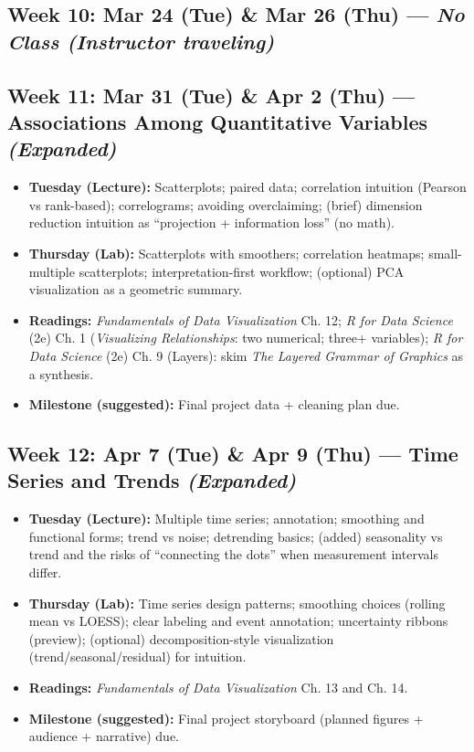 \documentclass[letterpaper,11pt]{article}
\newcommand{\FDV}{\emph{Fundamentals of Data Visualization}}
\newcommand{\RDS}{\emph{R for Data Science} (2e)}
\newcommand{\compresslist}{
\setlength{\itemsep}{1pt}
\setlength{\parskip}{0pt}
\setlength{\parsep}{0pt}
}
\begin{document}
\subsection*{Week 10: Mar 24 (Tue) \& Mar 26 (Thu) --- \textit{No Class (Instructor traveling)}}



\subsection*{Week 11: Mar 31 (Tue) \& Apr 2 (Thu) --- Associations Among Quantitative Variables \textit{(Expanded)}} 
\begin{itemize}\compresslist
\item \textbf{Tuesday (Lecture):} Scatterplots; paired data; correlation intuition (Pearson vs rank-based); correlograms; avoiding overclaiming; (brief) dimension reduction intuition as ``projection + information loss'' (no math).
\item \textbf{Thursday (Lab):} Scatterplots with smoothers; correlation heatmaps; small-multiple scatterplots; interpretation-first workflow; (optional) PCA visualization as a geometric summary.
\item \textbf{Readings:} \FDV{} Ch. 12; \RDS{} Ch. 1 (\emph{Visualizing Relationships}: two numerical; three+ variables); \RDS{} Ch. 9 (Layers): skim \emph{The Layered Grammar of Graphics} as a synthesis.
\item \textbf{Milestone (suggested):} Final project data + cleaning plan due.
\end{itemize}

\subsection*{Week 12: Apr 7 (Tue) \& Apr 9 (Thu) --- Time Series and Trends \textit{(Expanded)}} 
\begin{itemize}\compresslist
\item \textbf{Tuesday (Lecture):} Multiple time series; annotation; smoothing and functional forms; trend vs noise; detrending basics; (added) seasonality vs trend and the risks of ``connecting the dots'' when measurement intervals differ.
\item \textbf{Thursday (Lab):} Time series design patterns; smoothing choices (rolling mean vs LOESS); clear labeling and event annotation; uncertainty ribbons (preview); (optional) decomposition-style visualization (trend/seasonal/residual) for intuition.
\item \textbf{Readings:} \FDV{} Ch. 13 and Ch. 14.
\item \textbf{Milestone (suggested):} Final project storyboard (planned figures + audience + narrative) due.  %
\end{itemize}
\end{document}
